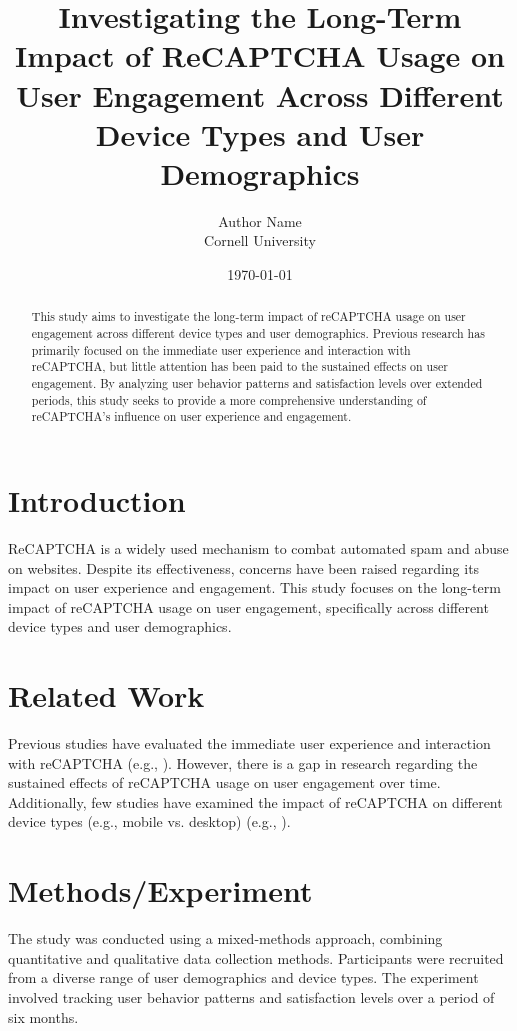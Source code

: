 \documentclass{article}
\title{Investigating the Long-Term Impact of ReCAPTCHA Usage on User Engagement Across Different Device Types and User Demographics}
\author{Author Name \\ Cornell University}
\date{\today}
\begin{document}
\maketitle

\begin{abstract}
This study aims to investigate the long-term impact of reCAPTCHA usage on user engagement across different device types and user demographics. Previous research has primarily focused on the immediate user experience and interaction with reCAPTCHA, but little attention has been paid to the sustained effects on user engagement. By analyzing user behavior patterns and satisfaction levels over extended periods, this study seeks to provide a more comprehensive understanding of reCAPTCHA's influence on user experience and engagement.
\end{abstract}

\section{Introduction}
ReCAPTCHA is a widely used mechanism to combat automated spam and abuse on websites. Despite its effectiveness, concerns have been raised regarding its impact on user experience and engagement. This study focuses on the long-term impact of reCAPTCHA usage on user engagement, specifically across different device types and user demographics.

\section{Related Work}
Previous studies have evaluated the immediate user experience and interaction with reCAPTCHA (e.g., \cite{reCapStudy}). However, there is a gap in research regarding the sustained effects of reCAPTCHA usage on user engagement over time. Additionally, few studies have examined the impact of reCAPTCHA on different device types (e.g., mobile vs. desktop) (e.g., \cite{deviceImpact}).

\section{Methods/Experiment}
The study was conducted using a mixed-methods approach, combining quantitative and qualitative data collection methods. Participants were recruited from a diverse range of user demographics and device types. The experiment involved tracking user behavior patterns and satisfaction levels over a period of six months.
\end{document}
